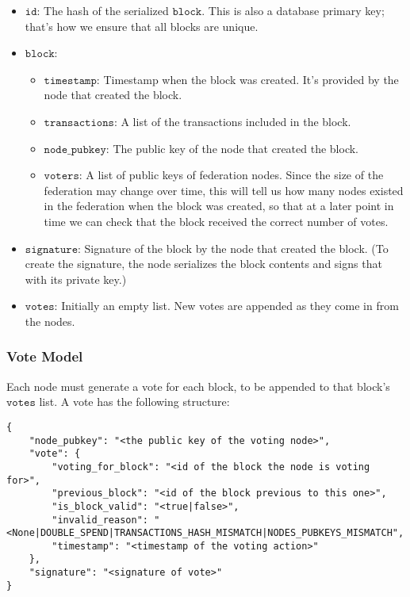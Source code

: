 \begin{itemize}
  \item $\mathtt{id}$: The hash of the serialized $\mathtt{block}$. This is also a database primary key; that's how we ensure that all blocks are unique.
  \item $\mathtt{block}$:
    \begin{itemize}
      \item $\mathtt{timestamp}$: Timestamp when the block was created. It's provided by the node that created the block.
      \item $\mathtt{transactions}$: A list of the transactions included in the block.
      \item $\mathtt{node\_pubkey}$: The public key of the node that created the block.
      \item $\mathtt{voters}$: A list of public keys of federation nodes. Since the size of the 
      federation may change over time, this will tell us how many nodes existed
      in the federation when the block was created, so that at a later point in
      time we can check that the block received the correct number of votes.
    \end{itemize}
  \item $\mathtt{signature}$: Signature of the block by the node that created the block. (To create the signature, the node serializes the block contents and signs that with its private key.)
  \item $\mathtt{votes}$: Initially an empty list. New votes are appended as they come in from the nodes.
\end{itemize}


\subsubsection{Vote Model}
Each node must generate a vote for each block, to be appended to that block's $\mathtt{votes}$ list. A vote has the following structure:

\begin{lstlisting}[style=json]
{
    "node_pubkey": "<the public key of the voting node>",
    "vote": {
        "voting_for_block": "<id of the block the node is voting for>",
        "previous_block": "<id of the block previous to this one>",
        "is_block_valid": "<true|false>",
        "invalid_reason": "<None|DOUBLE_SPEND|TRANSACTIONS_HASH_MISMATCH|NODES_PUBKEYS_MISMATCH",
        "timestamp": "<timestamp of the voting action>"
    },
    "signature": "<signature of vote>"
}
\end{lstlisting}


